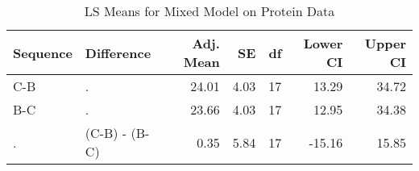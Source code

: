 \begin{table}

\caption{\label{tab:proteinDataLSMeans}LS Means for Mixed Model on Protein Data}
\centering
\begin{tabular}[t]{l>{}l|rrrrr}
\toprule
Sequence & Difference & Adj. Mean & SE & df & Lower CI & Upper CI\\
\midrule
C-B & . & 24.01 & 4.03 & 17 & 13.29 & 34.72\\
B-C & . & 23.66 & 4.03 & 17 & 12.95 & 34.38\\
. & (C-B) - (B-C) & 0.35 & 5.84 & 17 & -15.16 & 15.85\\
\bottomrule
\end{tabular}
\end{table}
